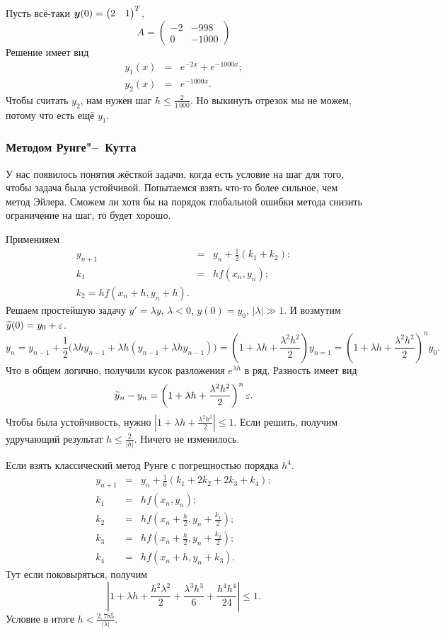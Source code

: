 Пусть всё-таки $\boldsymbol{y}(0) = \begin{pmatrix}
 2 & 1
\end{pmatrix}^T$,
\[
  A = \begin{pmatrix}
  -2 & -998\\
  0 & -1000
\end{pmatrix}
\]
Решение имеет вид
\begin{eqnarray*}
 y_1(x) &=&  e^{-2x} + e^{-1000x};\\
  y_2(x) &=&  e^{-1000x}.
\end{eqnarray*}
Чтобы считать $y_2$, нам нужен шаг $h\le \frac2{1\,000}$.
Но выкинуть отрезок мы не можем, потому что есть ещё $y_1$.

\subsubsection{Методом Рунге"--~Кутта}
У нас появилось понятия жёсткой задачи, когда есть условие на шаг для того, чтобы задача была устойчивой. Попытаемся взять что-то более сильное, чем метод Эйлера. Сможем ли хотя бы на порядок глобальной ошибки метода снизить ограничение на шаг, то будет хорошо.

Применияем
\begin{eqnarray*}
y_{n+1} &=&  y_n + \frac12 (k_1 + k_2);\\
k_1 &=&  h f(x_n,y_n);\\
k_2 = h f(x_n + h, y_n + h).
\end{eqnarray*}
Решаем простейшую задачу $y' = \lambda y$, $\lambda<0$, $y(0) = y_0$, $|\lambda|\gg 1$. И возмутим $\widetilde{y}{}(0) = y_0 + \varepsilon$.
\[
  y_n = y_{n-1} + \frac12 \big( \lambda h y_{n-1} + \lambda h (y_{n-1} + \lambda h y_{n-1})\big) = 
\left( 1 + \lambda h + \frac{\lambda^2 h^2}2 \right) y_{n=1} = \left( 1 + \lambda h + \frac{\lambda^2 h^2}2\right)^n y_0.
\]
Что в общем логично, получили кусок разложения $e^{\lambda h}$ в ряд. Разность имеет вид
\[
 \widetilde{y}{}_n - y_n = \left( 1 + \lambda h + \frac{\lambda^2 h^2}2\right)^n\varepsilon.
\]
Чтобы была устойчивость, нужно $\left| 1 + \lambda h + \frac{\lambda^2 h^2}2 \right|\le 1$. Если решить, получим удручающий результат  $h\le \frac2{|h|}$. Ничего не изменилось.

Если взять классический метод Рунге с погрешностью порядка $h^4$.
\begin{eqnarray*}
y_{n+1} &=&  y_n + \frac16(k_1 + 2 k_2 + 2k_3 + k_4);\\
k_1 &=& h f(x_n,y_n);\\
k_2 &=&  h f\left( x_n + \frac h2,y_n + \frac{k_1}2 \right);\\
k_3 &=& h f\left( x_n + \frac h2,y_n + \frac{k_2}2 \right);\\
k_4 &=& h f(x_n + h, y_n + k_3).
\end{eqnarray*}
Тут если поковыряться, получим
\[
\left| 1 + \lambda h + \frac{h^2\lambda^2}2 + \frac{\lambda^3h^3}6 + \frac{h^4h^4}{24} \right|\le 1.
\]
Условие в итоге $h < \frac{2{,}785}{|\lambda|}$.


